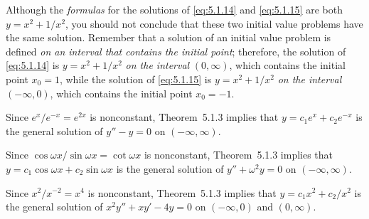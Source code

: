 \begin{examplesolution}
Although the {\relax\it formulas\/} for the solutions of \eqref{eq:5.1.14} and
\eqref{eq:5.1.15} are both $y=x^{2}+1/x^{2}$, you should not conclude that these two initial value
problems have the same solution. Remember that a solution of an initial value problem is defined
{\relax\it on an interval that contains the initial point\/}; therefore, the solution of
\eqref{eq:5.1.14} is $y=x^{2}+1/x^{2}$ {\relax\it on the interval\/} $(0,\infty)$, which
contains the initial point $x_{0}=1$, while the solution of \eqref{eq:5.1.15} is $y=x^{2}+1/x^{2}$
{\relax\it on the interval\/} $(-\infty,0)$, which contains the initial point $x_{0}=-1$.
\end{examplesolution}

\setcounter{example}{3}
\begin{example}
  \label{example:5.1.4} \rm \mbox{}
  \newline
  \begin{alist}
    \item %
    Since $e^{x}/e^{-x}=e^{2x}$ is nonconstant, Theorem~5.1.3 implies that
    $y=c_{1}e^{x}+c_{2}e^{-x}$ is the general solution of $y''-y=0$ on $(-\infty,\infty)$.

    \item %
    Since $\cos\omega x/\sin\omega x=\cot\omega x$ is nonconstant, Theorem~5.1.3
    implies that $y=c_{1}\cos\omega x+c_{2}\sin\omega x$ is the general solution of
    $y''+\omega^{2}y=0$ on $(-\infty,\infty)$.

    \item %
    Since $x^{2}/x^{-2}=x^{4}$ is nonconstant, Theorem~5.1.3 implies that
    $y=c_{1}x^{2}+c_{2}/x^{2}$ is the general solution of $x^{2}y''+xy'-4y=0$ on $(-\infty,0)$ and
    $(0,\infty)$.
  \end{alist}
\end{example}

